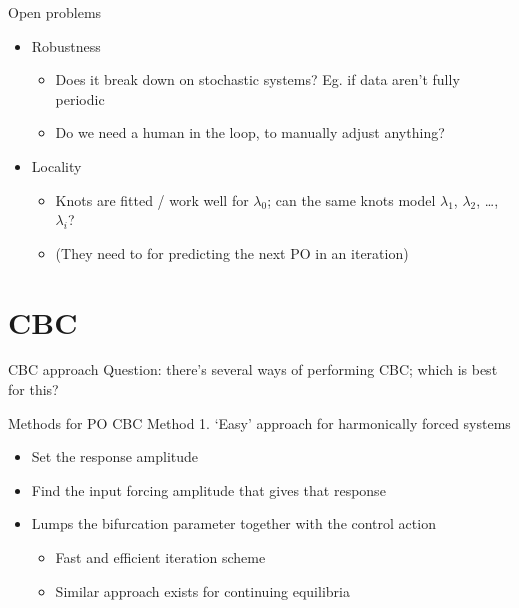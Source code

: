 \documentclass[presentation]{beamer}
\begin{document}
\begin{frame}[label={sec:orgfd59124}]{Open problems}
\begin{itemize}
\item Robustness
\begin{itemize}
\item Does it break down on stochastic systems? Eg. if data aren't fully periodic
\item Do we need a human in the loop, to manually adjust anything?
\end{itemize}
\end{itemize}
\vfill
\begin{itemize}
\item Locality
\begin{itemize}
\item Knots are fitted / work well for \(\lambda_0\); can the same knots model \(\lambda_1\), \(\lambda_2\), \dots{}, \(\lambda_i\)?
\item (They need to for predicting the next PO in an iteration)
\end{itemize}
\end{itemize}
\end{frame}

\section{CBC}
\label{sec:orgd6d21f7}
\begin{frame}[label={sec:orgc9f8e25}]{CBC approach}
Question: there's several ways of performing CBC; which is best for this?
\end{frame}

\begin{frame}[<+->][label={sec:orgfd661ae}]{Methods for PO CBC}
Method 1. `Easy' approach for harmonically forced systems
\vfill
\begin{itemize}
\item Set the response amplitude
\item Find the input forcing amplitude that gives that response
\item Lumps the bifurcation parameter together with the control action
\begin{itemize}
\item Fast and efficient iteration scheme
\item Similar approach exists for continuing equilibria
\end{itemize}
\end{itemize}
\end{frame}
\end{document}
